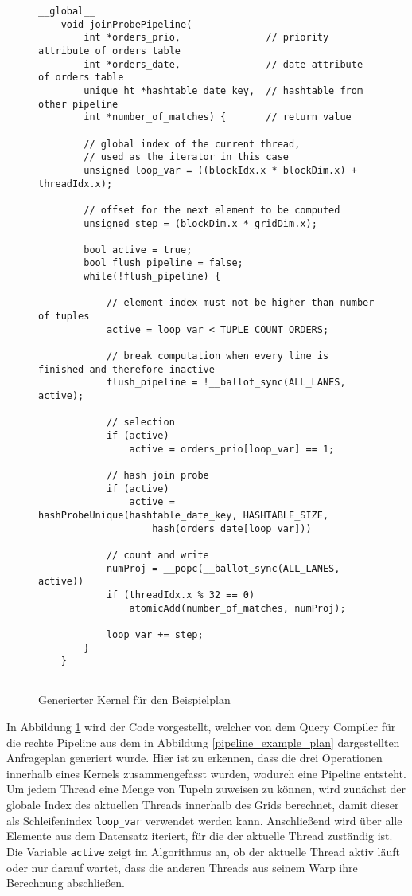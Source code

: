 \begin{figure}[h]
	\begin{lstlisting}[language=MyC++,
	linebackgroundcolor={%
	\ifnum\value{lstnumber}>24
		\ifnum\value{lstnumber}<28
			\color{design1!35}
		\fi
	\fi
	\ifnum\value{lstnumber}>28
		\ifnum\value{lstnumber}<33
			\color{design2!35}
		\fi
	\fi
	\ifnum\value{lstnumber}>33
		\ifnum\value{lstnumber}<38
			\color{design3!35}
		\fi
	\fi
	}]
	__global__
	void joinProbePipeline(
		int *orders_prio,              	// priority attribute of orders table
		int *orders_date,               // date attribute of orders table
		unique_ht *hashtable_date_key,  // hashtable from other pipeline
		int *number_of_matches) {       // return value
		
		// global index of the current thread,
		// used as the iterator in this case
		unsigned loop_var = ((blockIdx.x * blockDim.x) + threadIdx.x);
		
		// offset for the next element to be computed
		unsigned step = (blockDim.x * gridDim.x);
		
		bool active = true;
		bool flush_pipeline = false;
		while(!flush_pipeline) {
		
			// element index must not be higher than number of tuples
			active = loop_var < TUPLE_COUNT_ORDERS;
			
			// break computation when every line is finished and therefore inactive
			flush_pipeline = !__ballot_sync(ALL_LANES, active);
			
			// selection
			if (active)
				active = orders_prio[loop_var] == 1;
			
			// hash join probe
			if (active)
				active = hashProbeUnique(hashtable_date_key, HASHTABLE_SIZE, 
					hash(orders_date[loop_var]))
			
			// count and write
			numProj = __popc(__ballot_sync(ALL_LANES, active))
			if (threadIdx.x % 32 == 0)
				atomicAdd(number_of_matches, numProj);
			
			loop_var += step;
		}
	}
	
	\end{lstlisting}
	\caption{Generierter Kernel für den Beispielplan}
	\label{pipelining_example_code}
\end{figure}

In Abbildung \ref{pipelining_example_code} wird der Code vorgestellt, welcher von dem Query Compiler für die rechte Pipeline aus dem in Abbildung \ref{pipeline_example_plan} dargestellten Anfrageplan generiert wurde.
Hier ist zu erkennen, dass die drei Operationen innerhalb eines Kernels zusammengefasst wurden, wodurch eine Pipeline entsteht.
Um jedem Thread eine Menge von Tupeln zuweisen zu können, wird zunächst der globale Index des aktuellen Threads innerhalb des Grids berechnet, damit dieser als Schleifenindex \texttt{loop\_var} verwendet werden kann.
Anschließend wird über alle Elemente aus dem Datensatz iteriert, für die der aktuelle Thread zuständig ist.
Die Variable \texttt{active} zeigt im Algorithmus an, ob der aktuelle Thread aktiv läuft oder nur darauf wartet, dass die anderen Threads aus seinem Warp ihre Berechnung abschließen.


